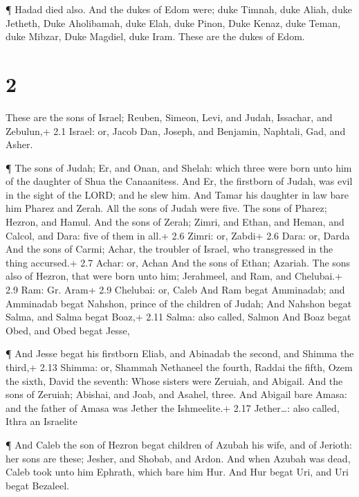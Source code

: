  ¶ Hadad died also. And the dukes of Edom were; duke
Timnah, duke Aliah, duke Jetheth,  Duke Aholibamah, duke
Elah, duke Pinon,  Duke Kenaz, duke Teman, duke Mibzar,
 Duke Magdiel, duke Iram. These are the dukes of Edom.

\hypertarget{section-1}{%
\section{2}\label{section-1}}

 These are the sons of Israel; Reuben, Simeon, Levi, and
Judah, Issachar, and Zebulun,+ 2.1 Israel: or, Jacob  Dan,
Joseph, and Benjamin, Naphtali, Gad, and Asher.

 ¶ The sons of Judah; Er, and Onan, and Shelah: which three
were born unto him of the daughter of Shua the Canaanitess. And Er, the
firstborn of Judah, was evil in the sight of the LORD; and he slew him.
 And Tamar his daughter in law bare him Pharez and Zerah.
All the sons of Judah were five.  The sons of Pharez;
Hezron, and Hamul.  And the sons of Zerah; Zimri, and Ethan,
and Heman, and Calcol, and Dara: five of them in all.+ 2.6 Zimri: or,
Zabdi+ 2.6 Dara: or, Darda  And the sons of Carmi; Achar,
the troubler of Israel, who transgressed in the thing accursed.+ 2.7
Achar: or, Achan  And the sons of Ethan; Azariah.
 The sons also of Hezron, that were born unto him;
Jerahmeel, and Ram, and Chelubai.+ 2.9 Ram: Gr. Aram+ 2.9 Chelubai: or,
Caleb  And Ram begat Amminadab; and Amminadab begat
Nahshon, prince of the children of Judah;  And Nahshon
begat Salma, and Salma begat Boaz,+ 2.11 Salma: also called, Salmon
 And Boaz begat Obed, and Obed begat Jesse,

 ¶ And Jesse begat his firstborn Eliab, and Abinadab the
second, and Shimma the third,+ 2.13 Shimma: or, Shammah 
Nethaneel the fourth, Raddai the fifth,  Ozem the sixth,
David the seventh:  Whose sisters were Zeruiah, and
Abigail. And the sons of Zeruiah; Abishai, and Joab, and Asahel, three.
 And Abigail bare Amasa: and the father of Amasa was Jether
the Ishmeelite.+ 2.17 Jether\ldots: also called, Ithra an Israelite

 ¶ And Caleb the son of Hezron begat children of Azubah his
wife, and of Jerioth: her sons are these; Jesher, and Shobab, and Ardon.
 And when Azubah was dead, Caleb took unto him Ephrath,
which bare him Hur.  And Hur begat Uri, and Uri begat
Bezaleel.

